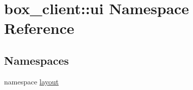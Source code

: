 \hypertarget{namespacebox__client_1_1ui}{
\section{box\_\-client::ui Namespace Reference}
\label{namespacebox__client_1_1ui}
}
\subsection*{Namespaces}
\begin{DoxyCompactItemize}
\item 
namespace \hyperlink{namespacebox__client_1_1ui_1_1layout}{layout}
\end{DoxyCompactItemize}
